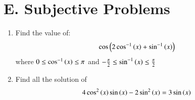 \documentclass[journal,12pt,twocolumn,article]{IEEEtran}
\theoremstyle{remark}
\begin{document}
\section*{E. Subjective Problems}
\begin{enumerate}
\item Find the value of: 
\begin{align*}
\cos \left(2\cos ^{-1}\left(x\right)+\sin ^{-1}\left(x\right)\right) 
\end{align*}
where $0\le \cos ^{-1}\left(x\right) \le \pi$ and $-\frac{\pi}{2}\le \sin ^{-1}\left(x\right) \le\frac{\pi}{2}$
\hfill {}
\item Find all the solution of
\begin{align*}
4\cos ^2\left(x\right)\sin \left(x\right)-2\sin ^2 \left(x\right) = 3\sin \left(x\right)
\end{align*}
\hfill {}
\end{enumerate}
\end{document}
